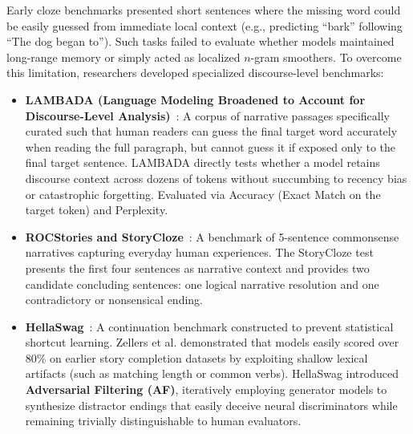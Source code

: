 \documentclass[../../main.tex]{subfiles}
\begin{document}
Early cloze benchmarks presented short sentences where the missing word could be easily guessed from immediate local context (e.g., predicting ``bark'' following ``The dog began to''). Such tasks failed to evaluate whether models maintained long-range memory or simply acted as localized $n$-gram smoothers. To overcome this limitation, researchers developed specialized discourse-level benchmarks:
\begin{itemize}
    \item \textbf{LAMBADA (Language Modeling Broadened to Account for Discourse-Level Analysis)}~\cite{paperno2016lambada}: A corpus of narrative passages specifically curated such that human readers can guess the final target word accurately when reading the full paragraph, but cannot guess it if exposed only to the final target sentence. LAMBADA directly tests whether a model retains discourse context across dozens of tokens without succumbing to recency bias or catastrophic forgetting. Evaluated via Accuracy (Exact Match on the target token) and Perplexity.
    \item \textbf{ROCStories and StoryCloze}~\cite{mostafazadeh2016rocstories}: A benchmark of 5-sentence commonsense narratives capturing everyday human experiences. The StoryCloze test presents the first four sentences as narrative context and provides two candidate concluding sentences: one logical narrative resolution and one contradictory or nonsensical ending.
    \item \textbf{HellaSwag}~\cite{zellers2019hellaswag}: A continuation benchmark constructed to prevent statistical shortcut learning. Zellers et al. demonstrated that models easily scored over 80\% on earlier story completion datasets by exploiting shallow lexical artifacts (such as matching length or common verbs). HellaSwag introduced \textbf{Adversarial Filtering (AF)}, iteratively employing generator models to synthesize distractor endings that easily deceive neural discriminators while remaining trivially distinguishable to human evaluators.
\end{itemize}
\end{document}
